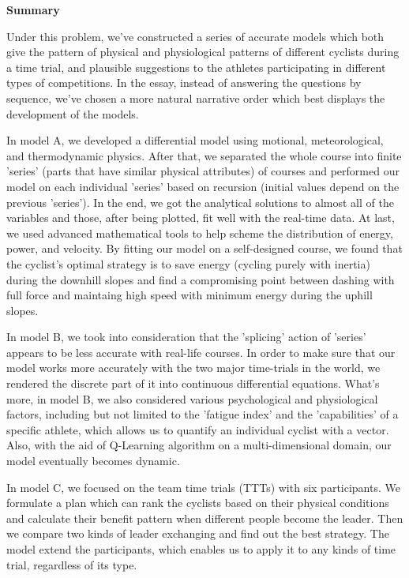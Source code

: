 \documentclass{article}
\begin{document}
	\normalfont{}\selectfont
    \begin{center}
        \textbf{\large Summary}

    \end{center}

	Under this problem, we've constructed a series of accurate models which both give the pattern of physical and physiological patterns of different cyclists during a time trial, and plausible suggestions to the athletes participating in different types of competitions. In the essay, instead of answering the questions by sequence, we've chosen a more natural narrative order which best displays the development of the models.

	In model A, we developed a differential model using motional, meteorological, and thermodynamic physics. After that, we separated the whole course into finite 'series' (parts that have similar physical attributes) of courses and performed our model on each individual 'series' based on recursion (initial values depend on the previous 'series'). In the end, we got the analytical solutions to almost all of the variables and those, after being plotted, fit well with the real-time data. At last, we used advanced mathematical tools to help scheme the distribution of energy, power, and velocity. By fitting our model on a self-designed course, we found that the cyclist's optimal strategy is to save energy (cycling purely with inertia) during the downhill slopes and find a compromising point between dashing with full force and maintaing high speed with minimum energy during the uphill slopes.

	In model B, we took into consideration that the 'splicing' action of 'series' appears to be less accurate with real-life courses. In order to make sure that our model works more accurately with the two major time-trials in the world, we rendered the discrete part of it into continuous differential equations. What's more, in model B, we also considered various psychological and physiological factors, including but not limited to the 'fatigue index' and the 'capabilities' of a specific athlete, which allows us to quantify an individual cyclist with a vector. Also, with the aid of Q-Learning algorithm on a multi-dimensional domain, our model eventually becomes dynamic.

	In model C, we focused on the team time trials (TTTs) with six participants. We formulate a plan which can rank the cyclists based on their physical conditions and calculate their benefit pattern when different people become the leader. Then we compare two kinds of leader exchanging and find out the best strategy. The model extend the participants, which enables us to apply it to any kinds of time trial, regardless of its type.
\end{document}
